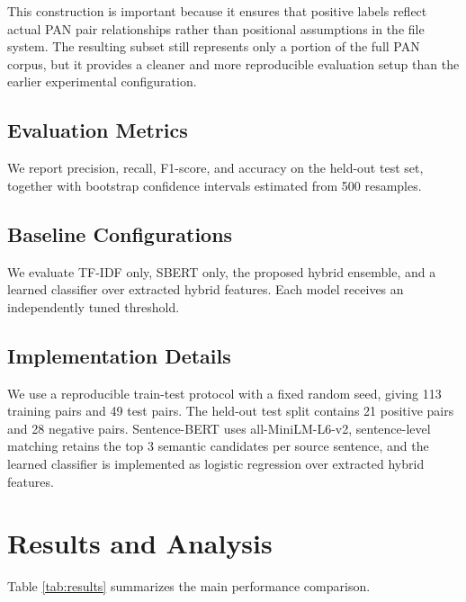 \documentclass{llncs}
\begin{document}
This construction is important because it ensures that positive labels reflect actual PAN pair relationships rather than positional assumptions in the file system. The resulting subset still represents only a portion of the full PAN corpus, but it provides a cleaner and more reproducible evaluation setup than the earlier experimental configuration.

\subsection{Evaluation Metrics}

We report precision, recall, F1-score, and accuracy on the held-out test set, together with bootstrap confidence intervals estimated from 500 resamples.

\subsection{Baseline Configurations}

We evaluate TF-IDF only, SBERT only, the proposed hybrid ensemble, and a learned classifier over extracted hybrid features. Each model receives an independently tuned threshold.

\subsection{Implementation Details}

We use a reproducible train-test protocol with a fixed random seed, giving 113 training pairs and 49 test pairs. The held-out test split contains 21 positive pairs and 28 negative pairs. Sentence-BERT uses all-MiniLM-L6-v2, sentence-level matching retains the top 3 semantic candidates per source sentence, and the learned classifier is implemented as logistic regression over extracted hybrid features.

\section{Results and Analysis}

Table \ref{tab:results} summarizes the main performance comparison.
\end{document}
